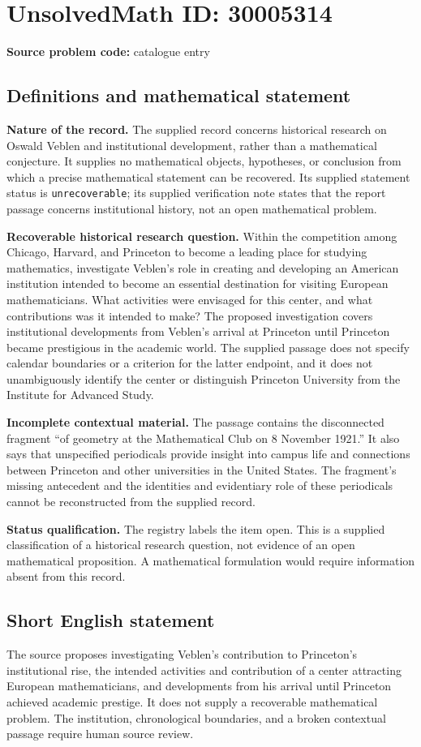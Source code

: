 \documentclass[11pt]{article}
\begin{document}
\section*{UnsolvedMath ID: 30005314}
\textbf{Source problem code:} catalogue entry
\subsection{Definitions and mathematical statement}
\textbf{Nature of the record.} The supplied record concerns historical research on Oswald Veblen and institutional development, rather than a mathematical conjecture. It supplies no mathematical objects, hypotheses, or conclusion from which a precise mathematical statement can be recovered. Its supplied statement status is \texttt{unrecoverable}; its supplied verification note states that the report passage concerns institutional history, not an open mathematical problem.

\textbf{Recoverable historical research question.} Within the competition among Chicago, Harvard, and Princeton to become a leading place for studying mathematics, investigate Veblen's role in creating and developing an American institution intended to become an essential destination for visiting European mathematicians. What activities were envisaged for this center, and what contributions was it intended to make? The proposed investigation covers institutional developments from Veblen's arrival at Princeton until Princeton became prestigious in the academic world. The supplied passage does not specify calendar boundaries or a criterion for the latter endpoint, and it does not unambiguously identify the center or distinguish Princeton University from the Institute for Advanced Study.

\textbf{Incomplete contextual material.} The passage contains the disconnected fragment ``of geometry at the Mathematical Club on 8 November 1921.'' It also says that unspecified periodicals provide insight into campus life and connections between Princeton and other universities in the United States. The fragment's missing antecedent and the identities and evidentiary role of these periodicals cannot be reconstructed from the supplied record.

\textbf{Status qualification.} The registry labels the item open. This is a supplied classification of a historical research question, not evidence of an open mathematical proposition. A mathematical formulation would require information absent from this record.
\subsection{Short English statement}
The source proposes investigating Veblen's contribution to Princeton's institutional rise, the intended activities and contribution of a center attracting European mathematicians, and developments from his arrival until Princeton achieved academic prestige. It does not supply a recoverable mathematical problem. The institution, chronological boundaries, and a broken contextual passage require human source review.
\end{document}
